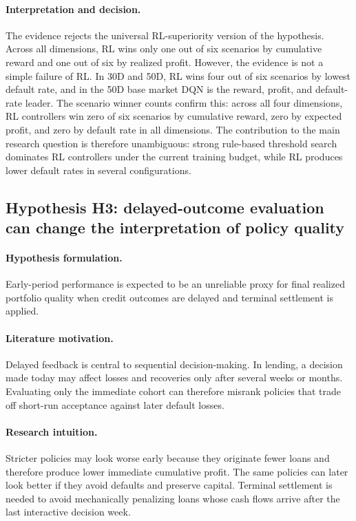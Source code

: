 \documentclass[12pt,a4paper]{article}
\begin{document}
\paragraph{Interpretation and decision.}
The evidence rejects the universal RL-superiority version of the hypothesis. Across all dimensions, RL wins only one out of six scenarios by cumulative reward and one out of six by realized profit. However, the evidence is not a simple failure of RL. In 30D and 50D, RL wins four out of six scenarios by lowest default rate, and in the 50D base market DQN is the reward, profit, and default-rate leader. The scenario winner counts confirm this: across all four dimensions, RL controllers win zero of six scenarios by cumulative reward, zero by expected profit, and zero by default rate in all dimensions. The contribution to the main research question is therefore unambiguous: strong rule-based threshold search dominates RL controllers under the current training budget, while RL produces lower default rates in several configurations.

\subsection{Hypothesis H3: delayed-outcome evaluation can change the interpretation of policy quality}

\paragraph{Hypothesis formulation.}
Early-period performance is expected to be an unreliable proxy for final realized portfolio quality when credit outcomes are delayed and terminal settlement is applied.

\paragraph{Literature motivation.}
Delayed feedback is central to sequential decision-making. In lending, a decision made today may affect losses and recoveries only after several weeks or months. Evaluating only the immediate cohort can therefore misrank policies that trade off short-run acceptance against later default losses.

\paragraph{Research intuition.}
Stricter policies may look worse early because they originate fewer loans and therefore produce lower immediate cumulative profit. The same policies can later look better if they avoid defaults and preserve capital. Terminal settlement is needed to avoid mechanically penalizing loans whose cash flows arrive after the last interactive decision week.
\end{document}

